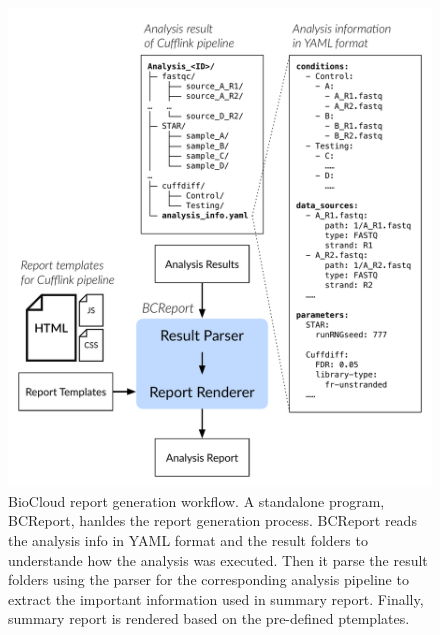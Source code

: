 \begin{figure}[!p]
\centering
\includegraphics[width=1\textwidth]{images/bcreport_workflow}
\caption[BioCloud report (BCReport) generation workflow]{
    BioCloud report generation workflow. A standalone program, BCReport,
    hanldes the report generation process. BCReport reads the analysis info in
    YAML format and the result folders to understande how the analysis was
    executed. Then it parse the result folders using the parser for the
    corresponding analysis pipeline to extract the important information used
    in summary report. Finally, summary report is rendered based on the
    pre-defined ptemplates.
}
\label{fig:bcreport-workflow}
\end{figure}

